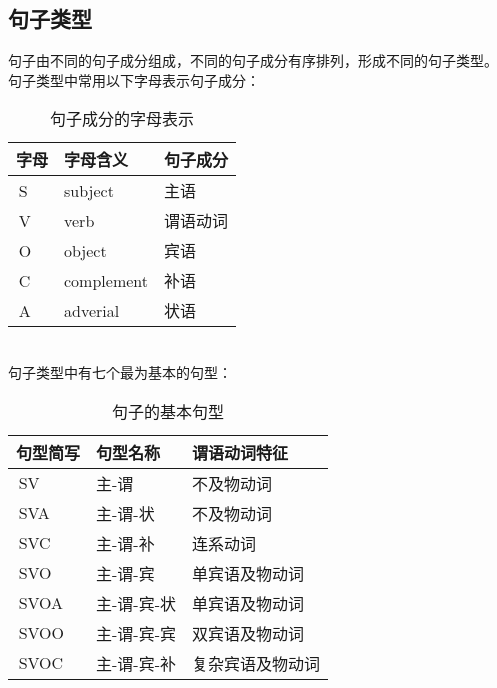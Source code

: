 \documentclass[UTF8]{ctexart}
\begin{document}
\subsection{句子类型}
    句子由不同的句子成分组成，不同的句子成分有序排列，形成不同的句子类型。\\[3mm]
    句子类型中常用以下字母表示句子成分：\vspace{5pt}
    \begin{table}[h]
        \begin{center}
            \ttfamily
            \begin{tabular}{p{40pt}|p{80pt}|p{100pt}}
                \hline
                字母&字母含义&句子成分\\ \hline
                \,S&subject&主语\\ \hline
                \,V&verb&谓语动词\\ \hline
                \,O&object&宾语\\ \hline
                \,C&complement&补语\\ \hline
                \,A&adverial&状语\\ \hline
            \end{tabular}
            \rmfamily
            \caption{句子成分的字母表示}
        \end{center}        
    \end{table}\\
    句子类型中有七个最为基本的句型：\vspace{5pt}
    \begin{table}[h]
        \begin{center}
            \ttfamily
            \begin{tabular}{p{60pt}|p{80pt}|p{120pt}}
                \hline
                句型简写&句型名称&谓语动词特征\\ \hline
                \,SV&主-谓&不及物动词\\ \hline
                \,SVA&主-谓-状&不及物动词\\ \hline
                \,SVC&主-谓-补&连系动词\\ \hline
                \,SVO&主-谓-宾&单宾语及物动词\\ \hline
                \,SVOA&主-谓-宾-状&单宾语及物动词\\ \hline
                \,SVOO&主-谓-宾-宾&双宾语及物动词\\ \hline
                \,SVOC&主-谓-宾-补&复杂宾语及物动词\\ \hline
            \end{tabular}
            \rmfamily
            \caption{句子的基本句型}
        \end{center}
    \end{table}\\
\end{document}
